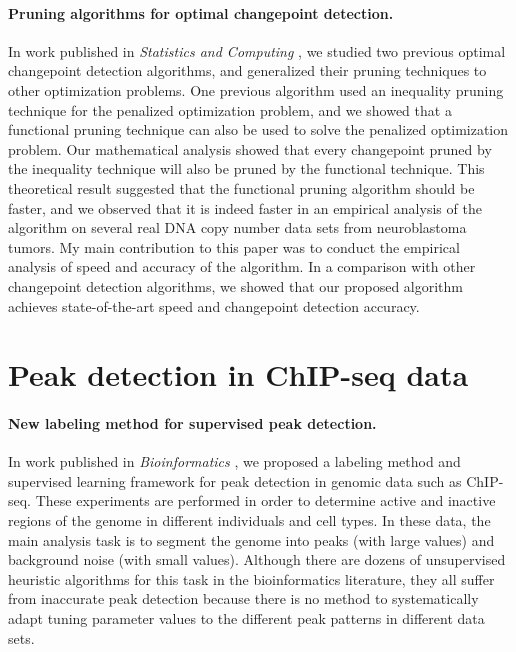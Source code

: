 \documentclass{article}
\begin{document}
\paragraph{Pruning algorithms for optimal changepoint detection.} In
work published in \emph{Statistics and Computing} \citep{fpop}, we
studied two previous optimal changepoint detection algorithms, and
generalized their pruning techniques to other optimization
problems. One previous algorithm used an inequality pruning technique
for the penalized optimization problem, and we showed that a
functional pruning technique can also be used to solve the penalized
optimization problem. Our mathematical analysis showed that every
changepoint pruned by the inequality technique will also be pruned by
the functional technique. This theoretical result suggested that the functional
pruning algorithm should be faster, and we observed that it is indeed
faster in an empirical analysis of the algorithm on several real DNA
copy number data sets from neuroblastoma tumors. My main contribution
to this paper was to conduct the empirical analysis of speed and
accuracy of the algorithm. In a comparison with other changepoint
detection algorithms, we showed that our proposed algorithm achieves
state-of-the-art speed and changepoint detection accuracy.

\section{Peak detection in ChIP-seq data}

\paragraph{New labeling method for supervised peak detection.} In work
published in \emph{Bioinformatics} \citep{HOCKING-chipseq}, we
proposed a labeling method and supervised learning framework for peak
detection in genomic data such as ChIP-seq. These experiments are
performed in order to determine active and inactive regions of the
genome in different individuals and cell types. In these data, the
main analysis task is to segment the genome into peaks (with large
values) and background noise (with small values). Although there are
dozens of unsupervised heuristic algorithms for this task in the
bioinformatics literature, they all suffer from inaccurate peak
detection because there is no method to systematically adapt tuning
parameter values to the different peak patterns in different data
sets.
\end{document}

